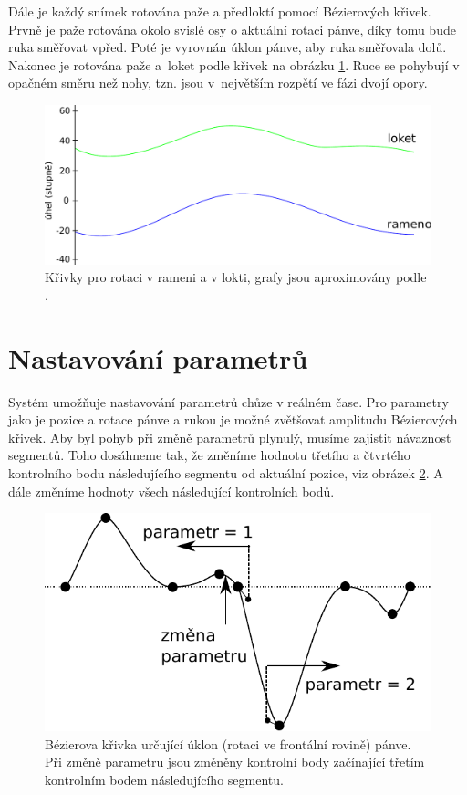 Dále je každý snímek rotována paže a předloktí pomocí Bézierových křivek. Prvně je paže rotována okolo svislé osy o aktuální rotaci pánve, díky tomu bude ruka směřovat vpřed. Poté je vyrovnán úklon pánve, aby ruka směřovala dolů. Nakonec je rotována paže a~loket podle křivek na obrázku \ref{fig:shoulder_elbow}. Ruce se pohybují v opačném směru než nohy, tzn. jsou v~největším rozpětí ve fázi dvojí opory.

\begin{figure}[h]
	\centering
	\includegraphics[width=0.7\linewidth]{fig/shoulder_elbow.pdf}
	\caption{Křivky pro rotaci v rameni a v lokti, grafy jsou aproximovány podle \cite{ceccato2009comparison}.}
	\label{fig:shoulder_elbow}
\end{figure}

\section{Nastavování parametrů}
Systém umožňuje nastavování parametrů chůze v reál\-ném čase. Pro parametry jako je pozice a rotace pánve a rukou je možné zvětšovat amplitudu Bézierových křivek. Aby byl pohyb při změně parametrů plynulý, musíme zajistit návaznost segmentů. Toho dosáhneme tak, že změníme hodnotu třetího a čtvrtého kontrolního bodu následujícího segmentu od aktuální pozice, viz obrázek \ref{fig:zmena_parametru_tilt}. A dále změníme hodnoty všech následující kontrolních bodů.

\begin{figure}[h]
	\centering
	\includegraphics[width=0.5\linewidth]{fig/zmena_parametru_tilt.pdf}
	\caption{Bézierova křivka určující úklon (rotaci ve frontální rovině) pánve. Při změně parametru jsou změněny kontrolní body začínající třetím kontrolním bodem následujícího segmentu.}
	\label{fig:zmena_parametru_tilt}
\end{figure}

